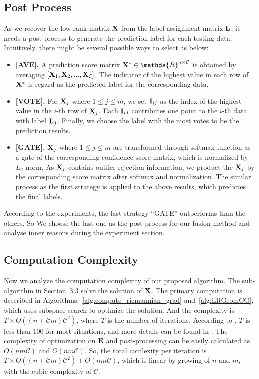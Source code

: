 \documentclass[10pt,twocolumn,letterpaper]{article}
\def\bI{{\bf I}}
\def\bE{{\bf E}}
\def\calC{{\mathcal{C}}}
\def\bL{{\bf L}}
\def\dsR{\mathds{R}}
\def\bX{{\bf X}}
\def\bI{{\bf I}}
\def\bX{{\bf X}}
\begin{document}
\subsection{Post Process}
As we recover the low-rank matrix $\bX$ from the label assignment matrix $\bL$,
it needs a post process to generate the prediction label for each testing data.
Intuitively, there might be several possible ways to select as below:
\begin{itemize}
  \item \textbf{[AVE].} A prediction score matrix $\bX^{*} \in \dsR^{n \times {\calC}}$ is obtained by averaging $[ \bX_1, \bX_2, ..., \bX_{\calC}]$.
    The indicator of the highest value in each row of $\bX^{*}$ is regard as the predicted label for the corresponding data.
  \item \textbf{[VOTE].} For $\bX_j$ where $1 \leq j \leq m$, we set $\bI_{ij}$ as the index of the highest value in the $i$-th row of $\bX_j$.
      Each $\bI_{ij}$ contributes one point to the $i$-th data with label $\bI_{ij}$.
      Finally, we choose the label with the most votes to be the prediction results.
  \item \textbf{[GATE].} $\bX_j$ where $1 \leq j \leq m$ are transformed through softmax function as a gate of the corresponding confidence score matrix, which is normalized by $L_2$ norm.
      As $\bX_j$ contains outlier rejection information, we product the $\bX_j$ by the corresponding score matrix after softmax and normalization.
      The similar process as the first strategy is applied to the above results, which predictes the final labels.
\end{itemize}
According to the experiments, the last strategy ``GATE'' outperforms than the others.
So We choose the last one as the post process for our fusion method and analyse inner reasons during the experiment section.

\subsection{Computation Complexity}

Now we analyze the computation complexity of our proposed algorithm.
The sub-algorithm in Section~3.3 solve the solution of $\bX$.
The primary computation is described in Algorithms.~\ref{alg:compute_riemannian_grad} and~\ref{alg:LRGeomCG},
which uses subspace search to optimize the solution.
And the complexity is $T \times O((n+{\calC}m){\calC}^2)$, where $T$ is the number of iterations.
According to \cite{vandereyckensiamjo2013low}, $T$ is less than 100 for most situations,
and more details can be found in \cite{vandereyckensiamjo2013low}.
The complexity of optimization on $\bE$ and post-processing can be easily calculated as $O(nm{\calC})$ and $O(nm{\calC})$.
So, the total comlexity per iteration is $T \times O((n+{\calC}m){\calC}^2) + O(nm{\calC})$,
which is linear by growing of $n$ and $m$, with the cubic complexity of $\calC$.
\end{document}
